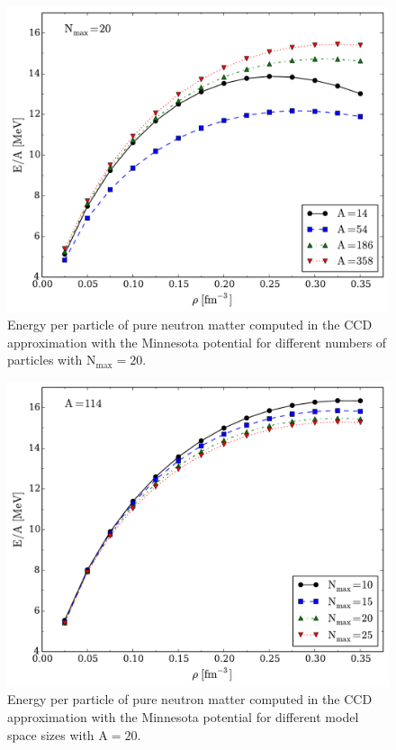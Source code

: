 \begin{figure}
  \includegraphics[width=\linewidth]{Chapter9-figures/fig1.pdf}
  \caption{Energy per particle of pure neutron matter computed in the CCD approximation with the Minnesota potential for different numbers of particles with $\mathrm{N_{max}=20}$.}
  \label{fig:fig1}
\end{figure}

\begin{figure}
  \includegraphics[width=\linewidth]{Chapter9-figures/fig2.pdf}
  \caption{Energy per particle of pure neutron matter computed in the CCD approximation with the Minnesota potential for different model space sizes with $\mathrm{A=20}$.}
  \label{fig:fig2}
\end{figure}

